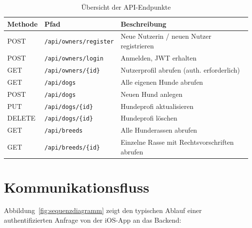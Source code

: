 \begin{table}[H]
  \centering
  \caption{Übersicht der API-Endpunkte}
  \label{tab:api-endpunkte}
  \begin{tabularx}{\textwidth}{|l|l|Y|}
    \hline
    \textbf{Methode} & \textbf{Pfad} & \textbf{Beschreibung} \\
    \hline
    POST   & \texttt{/api/owners/register} & Neue Nutzerin / neuen Nutzer registrieren \\
    \hline
    POST   & \texttt{/api/owners/login}    & Anmelden, JWT erhalten \\
    \hline
    GET    & \texttt{/api/owners/\{id\}}   & Nutzerprofil abrufen (auth. erforderlich) \\
    \hline
    GET    & \texttt{/api/dogs}            & Alle eigenen Hunde abrufen \\
    \hline
    POST   & \texttt{/api/dogs}            & Neuen Hund anlegen \\
    \hline
    PUT    & \texttt{/api/dogs/\{id\}}     & Hundeprofi aktualisieren \\
    \hline
    DELETE & \texttt{/api/dogs/\{id\}}     & Hundeprofi löschen \\
    \hline
    GET    & \texttt{/api/breeds}          & Alle Hunderassen abrufen \\
    \hline
    GET    & \texttt{/api/breeds/\{id\}}   & Einzelne Rasse mit Rechtsvorschriften abrufen \\
    \hline
  \end{tabularx}
\end{table}

\section{Kommunikationsfluss}
\label{sec:kommunikationsfluss}

Abbildung~\ref{fig:sequenzdiagramm} zeigt den typischen Ablauf einer authentifizierten
Anfrage von der iOS-App an das Backend:

